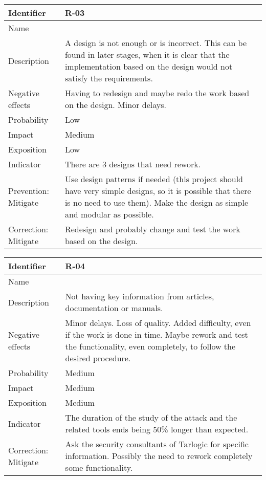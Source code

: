\begin{table}[H]
	\begin{tabularx}{\textwidth}{|y|z|}
		\hline
		Identifier & \textbf{R-03} \\ \hline
		Name & \Rtres \\ \hline
		Description &
			A design is not enough or is incorrect. \linej
			This can be found in later stages, when it is clear that the implementation based on the design would not satisfy the requirements.
		\\ \hline
		Negative effects &
			Having to redesign and maybe redo the work based on the design. \linej
			Minor delays.
		\\ \hline
		Probability & Low\\ \hline
		Impact &  Medium\\ \hline
		Exposition & Low\\ \hline
		Indicator & There are 3 designs that need rework.\\ \hline
		Prevention: Mitigate &
			Use design patterns if needed (this project should have very simple designs, so it is possible that there is no need to use them). \linej
			Make the design as simple and modular as possible.
		\\ \hline
		Correction: Mitigate &
			Redesign and probably change and test the work based on the design.
		\\ \hline
	\end{tabularx}
\end{table}

\begin{table}[H]
	\begin{tabularx}{\textwidth}{|y|z|}
		\hline
		Identifier & \textbf{R-04} \\ \hline
		Name & \Rcuatro \\ \hline
		Description &
			Not having key information from articles, documentation or manuals.
		\\ \hline
		Negative effects &
			Minor delays. \linej
			Loss of quality. \linej
			Added difficulty, even if the work is done in time. \linej
			Maybe rework and test the functionality, even completely, to follow the desired procedure.
		\\ \hline
		Probability & Medium\\ \hline
		Impact &  Medium\\ \hline
		Exposition &  Medium\\ \hline
		Indicator & The duration of the study of the attack and the related tools ends being 50\% longer than expected. \\ \hline
		Correction: Mitigate &
			Ask the security consultants of Tarlogic for specific information. \linej
			Possibly the need to rework completely some functionality.
		\\ \hline
	\end{tabularx}
\end{table}

